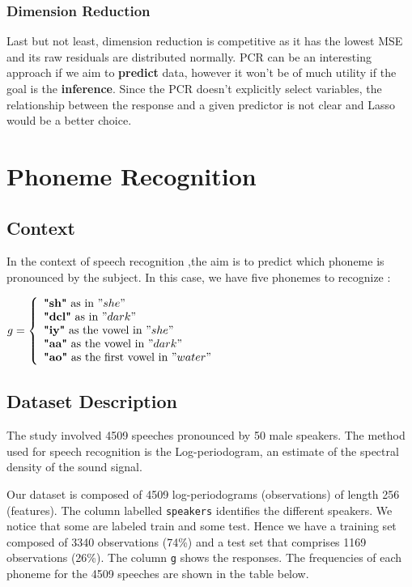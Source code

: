\documentclass[]{report}
\begin{document}
\subsection{Dimension Reduction}
Last but not least, dimension reduction is competitive as it has the lowest MSE and its raw residuals are distributed normally. PCR can be an interesting approach if we aim to \textbf{predict} data, however it won't be of much utility if the goal is the \textbf{inference}. Since the PCR doesn't explicitly select variables, the relationship between the response and a given predictor is not clear and Lasso would be a better choice. 


\chapter{Phoneme Recognition}
\section{Context}
In the context of speech recognition ,the aim is to predict which phoneme is pronounced by the subject. In this case, we have five phonemes to recognize :\\ 
\begin{center}
	$g = \left\{
	\begin{array}{l}
	\textbf{"sh"} \text{ as in } "she" \\
	\textbf{"dcl"} \text{ as in } "dark" \\
	\textbf{"iy"} \text{ as the vowel in } "she" \\ 
	\textbf{"aa"} \text{ as the vowel in }  "dark"\\
	\textbf{"ao"} \text{ as the first vowel in }  "water"
	\end{array}
	\right.$
\end{center}

\section{Dataset Description}

The study involved 4509 speeches pronounced by 50 male speakers. The method used for speech recognition is the Log-periodogram, an estimate of the spectral density of the sound signal.

Our dataset is composed of 4509 log-periodograms (observations) of length 256 (features). The column labelled \texttt{speakers} identifies the different speakers. We notice that some are labeled train and some test. Hence we have a training set composed of 3340 observations (74\%) and a test set that comprises 1169 observations (26\%). The column \texttt{g} shows the responses. The frequencies of each phoneme for the 4509 speeches are shown in the table below.
\end{document}

